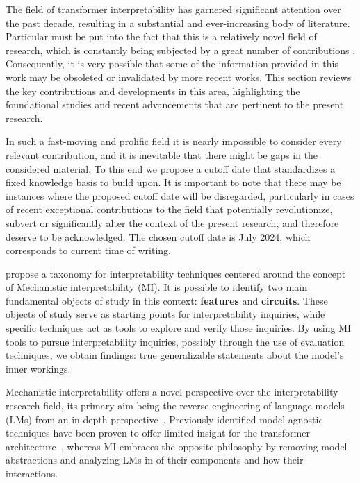 The field of transformer interpretability has garnered significant attention over the past decade, resulting in a substantial and ever-increasing body of literature.
Particular  must be put into the fact that this is a relatively novel field of research, which is constantly being subjected by a great number of contributions .
Consequently, it is very possible that some of the information provided in this work may be obsoleted or invalidated by more recent works.
This section reviews the key contributions and developments in this area, highlighting the foundational studies and recent advancements that are pertinent to the present research.

In such a fast-moving and prolific field it is nearly impossible to consider every relevant contribution, and it is inevitable that there might be gaps in the considered material.
To this end we propose a cutoff date that standardizes a fixed knowledge basis to build upon.
It is important to note that there may be instances where the proposed cutoff date will be disregarded, particularly in cases of recent exceptional contributions to the field that potentially revolutionize, subvert or significantly alter the context of the present research, and therefore deserve to be acknowledged.
The chosen cutoff date is July 2024, which corresponds to current time of writing.


\citet{rai2024} propose a taxonomy for interpretability techniques centered around the concept of Mechanistic interpretability (MI).
It is possible to identify two main fundamental objects of study in this context: \textbf{features} and \textbf{circuits}.
These objects of study serve as starting points for interpretability inquiries, while specific techniques act as tools to explore and verify those inquiries.
By using MI tools to pursue interpretability inquiries, possibly through the use of evaluation techniques, we obtain findings: true generalizable statements about the model's inner workings.

Mechanistic interpretability offers a novel perspective over the interpretability research field, its primary aim being the reverse-engineering of language models (LMs) from an in-depth perspective~\cite{olah2022}.
Previously identified model-agnostic techniques have been proven to offer limited insight for the transformer architecture~\cite{neely2022,pruthi2022,bibal2022,krishna2024}, whereas MI embraces the opposite philosophy by removing model abstractions and analyzing LMs in  of their components and how their interactions.

